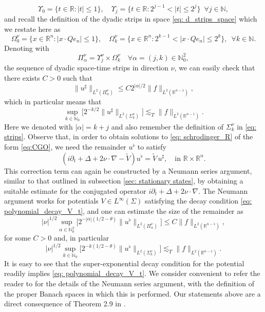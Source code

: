 \documentclass[10pt,a4paper]{amsart}
\theoremstyle{remark}
\theoremstyle{definition}
\newcommand{\R}{\mathbb{R}}
\newcommand{\N}{\mathbb{N}}
\def\wt{\widetilde}
\begin{document}
%
\[ \Upsilon_0 = \{ t \in \R : |t| \leq 1  \}, \quad
\Upsilon_j = \{ t \in \R : 2^{j - 1} < |t| \leq 2^j \} \enspace \forall j \in \N, 
\]
%
and recall the definition of the dyadic strips in space \eqref{eq: d_strips_space} which we restate here as 
\[ 
\Omega^\nu_0 = \{ x \in \R^n : |x \cdot Qe_n| \leq 1  \}, \quad
\Omega^\nu_k = \{ x \in \R^n : 2^{k - 1} < |x \cdot Qe_n| \leq 2^k \}, \enspace \forall k \in \N.
\]
%
Denoting with
%
\[
\Pi_\alpha^\nu = \Upsilon_j^\nu\times\Omega_k^\nu \quad \forall \alpha = (j,k)\in \N^2_0,
\]
%
the sequence of dyadic space-time strips in direction $\nu$, we can easily check that there exists $C>0$ such that
%
\begin{equation}\label{eq: sol_sharp_est1}
\| u^\sharp \|_{L^2 (\Pi_\alpha^\nu)} \leq C 2^{|\alpha| /2} \| f \|_{L^2(\R^{n - 1})},
\end{equation}
%
which in particular means that
%
\begin{equation}\label{eq:solSharpEst}
\sup_{k \in \N_0} \big[ 2^{-k/2} \| u^\sharp \|_{L^2 (\Sigma^\nu_k)} \big] \lesssim_T \| f \|_{L^2(\R^{n - 1})}.
\end{equation}
%
Here we denoted with $|\alpha|=k+j$ and also remember the definition of $\Sigma_k^\nu$ in \eqref{eq: strips}.
%
Observe that, in order to obtain solutions to \eqref{eq: schrodinger_R} of the form \eqref{eq:CGO}, we need the remainder $u^\flat$ to satisfy
%
\begin{equation}\label{eq: neumann}
	(i\partial_t+\Delta+2\nu\cdot\nabla- \wt{V})u^\flat=\wt{V}\,u^\sharp,\quad \textrm{in }\R\times\R^n.
\end{equation}
%
This correction term can again be constructed by a Neumann series argument, similar to that outlined in subsection \ref{sec: stationary states}, by obtaining a suitable estimate for the conjugated operator $i\partial_t+\Delta+2\nu\cdot\nabla$. The Neumann argument works for potentials $V\in L^\infty(\Sigma)$ satisfying the decay condition \eqref{eq: polynomial_decay_V_t}, and one can estimate the size of the remainder as
%
%
\begin{equation}\label{eq: sol_flat_est1} 
|\nu|^{1/2} \sup_{\alpha \in \N^2_0} \big[ 2^{-|\alpha|(1/2 - \theta)} \| u^\flat \|_{L^2 (\Pi_\alpha^\nu)} \big] \leq C  \| f \|_{L^2(\R^{n - 1})}, 
\end{equation}
%
for some $C>0$ and, in particular
%
\begin{equation}\label{eq:solFlatEst}   
|\nu|^{1/2} \sup_{k \in \N_0} \big[ 2^{-k(1/2 - \theta)} \| u^\flat \|_{L^2 (\Sigma^\nu_k)} \big] \lesssim_T  \| f \|_{L^2(\R^{n - 1})}. 
\end{equation}
%
It is easy to see that the super-exponential decay condition for the potential readily implies \eqref{eq: polynomial_decay_V_t}. 
We consider convenient to refer the reader to \cite{zbMATH07801151} for the details of the Neumann series argument, with the definition of the proper Banach spaces in which this is performed. Our statements above are a direct consequence of Theorem 2.9 in \cite{zbMATH07801151}.
\end{document}
